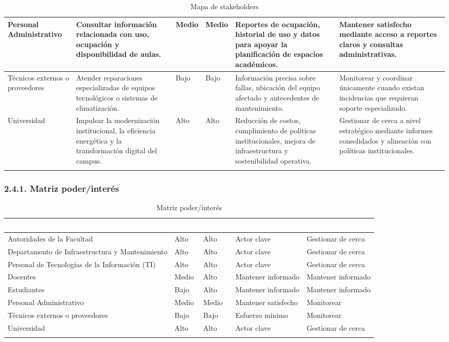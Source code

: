 \begin{longtable}{|P{0.1667}|P{0.1667}|P{0.1667}|P{0.1667}|P{0.1667}|P{0.1667}|}
Personal Administrativo & Consultar información relacionada con uso, ocupación y disponibilidad de aulas. & Medio & Medio & Reportes de ocupación, historial de uso y datos para apoyar la planificación de espacios académicos. & Mantener satisfecho mediante acceso a reportes claros y consultas administrativas. \\ \hline
Técnicos externos o proveedores & Atender reparaciones especializadas de equipos tecnológicos o sistemas de climatización. & Bajo & Bajo & Información precisa sobre fallas, ubicación del equipo afectado y antecedentes de mantenimiento. & Monitorear y coordinar únicamente cuando existan incidencias que requieran soporte especializado. \\ \hline
Universidad & Impulsar la modernización institucional, la eficiencia energética y la transformación digital del campus. & Alto & Alto & Reducción de costos, cumplimiento de políticas institucionales, mejora de infraestructura y sostenibilidad operativa. & Gestionar de cerca a nivel estratégico mediante informes consolidados y alineación con políticas institucionales. \\ \hline
\caption{Mapa de stakeholders}
\end{longtable}
\endgroup

\subsubsection*{2.4.1. Matriz poder/interés}


\begingroup
\small
\begin{longtable}{|P{0.2000}|P{0.2000}|P{0.2000}|P{0.2000}|P{0.2000}|}
\hline
{}\textcolor{white}{\textbf{Stakeholder}} & \textcolor{white}{\textbf{Poder}} & \textcolor{white}{\textbf{Interés}} & \textcolor{white}{\textbf{Clasificación}} & \textcolor{white}{\textbf{Estrategia}} \\ \hline
Autoridades de la Facultad & Alto & Alto & Actor clave & Gestionar de cerca \\ \hline
Departamento de Infraestructura y Mantenimiento & Alto & Alto & Actor clave & Gestionar de cerca \\ \hline
Personal de Tecnologías de la Información (TI) & Alto & Alto & Actor clave & Gestionar de cerca \\ \hline
Docentes & Medio & Alto & Mantener informado & Mantener informado \\ \hline
Estudiantes & Bajo & Alto & Mantener informado & Mantener informado \\ \hline
Personal Administrativo & Medio & Medio & Mantener satisfecho & Monitorear \\ \hline
Técnicos externos o proveedores & Bajo & Bajo & Esfuerzo mínimo & Monitorear \\ \hline
Universidad & Alto & Alto & Actor clave & Gestionar de cerca \\ \hline
\caption{Matriz poder/interés}
\end{longtable}
\endgroup

